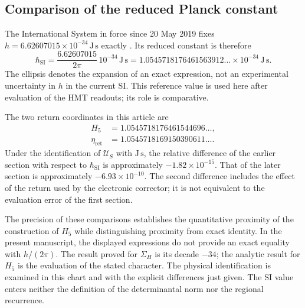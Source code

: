 \subsection{Comparison of the reduced Planck constant}
\label{sec:revision-planck-contraste}

The International System in force since 20 May 2019 fixes
\(h=6.62607015\times10^{-34}\,\mathrm{J\,s}\) exactly
\cite{bipm2018}. Its reduced constant is therefore
\[
 \hbar_{\mathrm{SI}}=\frac{6.62607015}{2\pi}\,10^{-34}\,
 \mathrm{J\,s}
 =1.0545718176461563912\ldots\times10^{-34}\,\mathrm{J\,s}.
\]
The ellipsis denotes the expansion of an exact expression,
not an experimental uncertainty in \(h\) in the current SI.
This reference value is used here after evaluation of
the HMT readouts; its role is comparative.

The two return coordinates in this article are
\begin{align*}
 H_5&=1.0545718176461544696\ldots,\\
 \eta_{\mathrm{ret}}&=1.0545718169150390611\ldots.
\end{align*}
Under the identification of \(\mathcal U_S\) with \(\mathrm{J\,s}\), the
relative difference of the earlier section with respect to
\(\hbar_{\mathrm{SI}}\) is approximately \(-1.82\times10^{-15}\).
That of the later section is approximately \(-6.93\times10^{-10}\).
The second difference includes the effect of the return used by the
electronic corrector; it is not equivalent to the evaluation error of the
first section.

The precision of these comparisons establishes the quantitative
proximity of the construction of \(H_5\) while distinguishing
proximity from exact identity. In the present manuscript, the displayed
expressions do not provide an exact equality with \(h/(2\pi)\).
The result proved for \(\Sigma_H\) is its decade \(-34\);
the analytic result for \(H_5\) is the evaluation of the
stated character. The physical identification is examined in this chart and with the
explicit differences just given. The SI value enters neither
the definition of the determinantal norm nor the regional recurrence.
